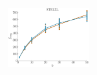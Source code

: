 \documentclass[a4paper]{report}
\newcommand{\wratio}{0.16}
\begin{document}
\includegraphics[width=\wratio\textwidth]{maxcut/STELZL/fs_stelzl}\hfill
\clearpage
\end{document}
